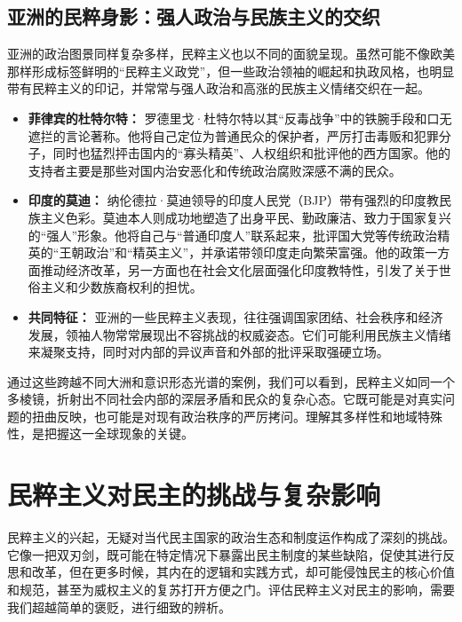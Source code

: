 \documentclass[UTF8, 10pt]{ctexbook}
\begin{document}
\subsection{亚洲的民粹身影：强人政治与民族主义的交织}
亚洲的政治图景同样复杂多样，民粹主义也以不同的面貌呈现。虽然可能不像欧美那样形成标签鲜明的“民粹主义政党”，但一些政治领袖的崛起和执政风格，也明显带有民粹主义的印记，并常常与强人政治和高涨的民族主义情绪交织在一起。
\begin{itemize}
    \item \textbf{菲律宾的杜特尔特：} 罗德里戈·杜特尔特以其“反毒战争”中的铁腕手段和口无遮拦的言论著称。他将自己定位为普通民众的保护者，严厉打击毒贩和犯罪分子，同时也猛烈抨击国内的“寡头精英”、人权组织和批评他的西方国家。他的支持者主要是那些对国内治安恶化和传统政治腐败深感不满的民众。
    \item \textbf{印度的莫迪：} 纳伦德拉·莫迪领导的印度人民党（BJP）带有强烈的印度教民族主义色彩。莫迪本人则成功地塑造了出身平民、勤政廉洁、致力于国家复兴的“强人”形象。他将自己与“普通印度人”联系起来，批评国大党等传统政治精英的“王朝政治”和“精英主义”，并承诺带领印度走向繁荣富强。他的政策一方面推动经济改革，另一方面也在社会文化层面强化印度教特性，引发了关于世俗主义和少数族裔权利的担忧。
    \item \textbf{共同特征：} 亚洲的一些民粹主义表现，往往强调国家团结、社会秩序和经济发展，领袖人物常常展现出不容挑战的权威姿态。它们可能利用民族主义情绪来凝聚支持，同时对内部的异议声音和外部的批评采取强硬立场。
\end{itemize}
通过这些跨越不同大洲和意识形态光谱的案例，我们可以看到，民粹主义如同一个多棱镜，折射出不同社会内部的深层矛盾和民众的复杂心态。它既可能是对真实问题的扭曲反映，也可能是对现有政治秩序的严厉拷问。理解其多样性和地域特殊性，是把握这一全球现象的关键。

\section{民粹主义对民主的挑战与复杂影响}
\lettrine[lines=2]{民}{粹主义}的兴起，无疑对当代民主国家的政治生态和制度运作构成了深刻的挑战。它像一把双刃剑，既可能在特定情况下暴露出民主制度的某些缺陷，促使其进行反思和改革，但在更多时候，其内在的逻辑和实践方式，却可能侵蚀民主的核心价值和规范，甚至为威权主义的复苏打开方便之门。评估民粹主义对民主的影响，需要我们超越简单的褒贬，进行细致的辨析。
\end{document}
